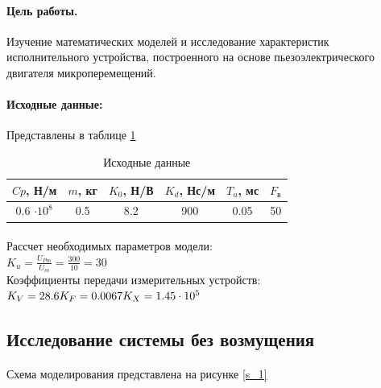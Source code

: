 \documentclass[a4paper,12pt]{article}
\renewcommand{\arraystretch}{1.5}
\begin{document}
	
	\paragraph{Цель работы.}  Изучение математических моделей и исследование характеристик исполнительного устройства, построенного на основе пьезоэлектрического двигателя микроперемещений. 
	\paragraph {Исходные данные:} Представлены в таблице \ref{t_1}
	\begin{table}[h]
		\centering
		\caption{Исходные данные}
		\renewcommand{\arraystretch}{2} 
		\renewcommand{\tabcolsep}{0.85cm}
		\begin{center}
			\begin{tabular}{|c|c|c|c|c|c|}
				\hline
				$Cp$, Н/м & $m$, кг & $K_0$, Н/В & $K_d$, Нс/м & $T_u$, мс & $F_{\text{в}}$ \\ \hline
				0.6 $\cdot 10^8$ & 0.5 & 8.2 & 900 & 0.05 & 50  \\ \hline
			\end{tabular}
		\end{center}
		\label{t_1}
	\end{table}
	
	\paragraph {} Рассчет необходимых параметров модели:\\
	
	\noindent
	$K_u=\displaystyle\frac{U_{Pm}}{U_m}=\frac{300}{10}=30$\\
	
	Коэффициенты передачи измерительных устройств:\\
	
	\noindent
	$
	K_V=28.6\\
	K_F=0.0067\\
	K_X=1.45\cdot 10^5\\	
	$
	\newpage
	\begin{center}
	\section{Исследование системы без возмущения}
	\end{center}
	\paragraph {} Схема моделирования представлена на рисунке \ref{s_1}
	
\end{document}
